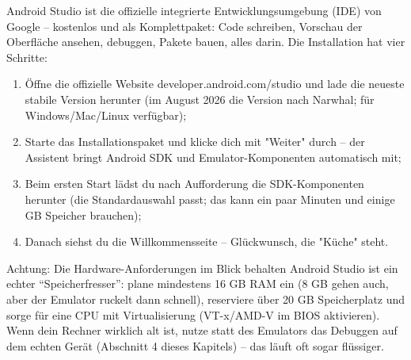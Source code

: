 


Android Studio ist die offizielle integrierte Entwicklungsumgebung (IDE) von Google – kostenlos und als Komplettpaket: Code schreiben, Vorschau der Oberfläche ansehen, debuggen, Pakete bauen, alles darin. Die Installation hat vier Schritte:

\begin{enumerate}
  \item Öffne die offizielle Website developer.android.com/studio und lade die neueste stabile Version herunter (im August 2026 die Version nach Narwhal; für Windows/Mac/Linux verfügbar);
  \item Starte das Installationspaket und klicke dich mit "Weiter" durch – der Assistent bringt Android SDK und Emulator-Komponenten automatisch mit;
  \item Beim ersten Start lädst du nach Aufforderung die SDK-Komponenten herunter (die Standardauswahl passt; das kann ein paar Minuten und einige GB Speicher brauchen);
  \item Danach siehst du die Willkommensseite – Glückwunsch, die "Küche" steht.
\end{enumerate}

\begin{tcbwarn}{Achtung: Die Hardware-Anforderungen im Blick behalten}
Android Studio ist ein echter “Speicherfresser”: plane mindestens 16 GB RAM ein (8 GB gehen auch, aber der Emulator ruckelt dann schnell), reserviere über 20 GB Speicherplatz und sorge für eine CPU mit Virtualisierung (VT-x/AMD-V im BIOS aktivieren). Wenn dein Rechner wirklich alt ist, nutze statt des Emulators das Debuggen auf dem echten Gerät (Abschnitt 4 dieses Kapitels) – das läuft oft sogar flüssiger.

\end{tcbwarn}


